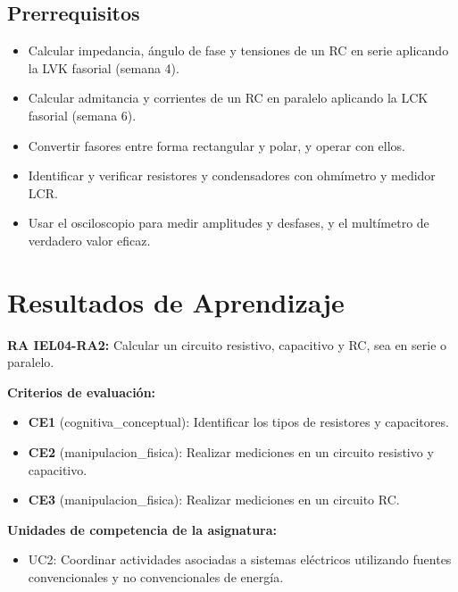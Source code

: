 \documentclass[11pt,letterpaper]{article}
\begin{document}
\subsection{Prerrequisitos}

\begin{itemize}
  \item Calcular impedancia, ángulo de fase y tensiones de un RC en serie aplicando la LVK fasorial (semana 4).
  \item Calcular admitancia y corrientes de un RC en paralelo aplicando la LCK fasorial (semana 6).
  \item Convertir fasores entre forma rectangular y polar, y operar con ellos.
  \item Identificar y verificar resistores y condensadores con ohmímetro y medidor LCR.
  \item Usar el osciloscopio para medir amplitudes y desfases, y el multímetro de verdadero valor eficaz.
\end{itemize}

\section{Resultados de Aprendizaje}

\begin{alineacion}
\textbf{RA IEL04-RA2:} Calcular un circuito resistivo, capacitivo y RC, sea en serie o paralelo.

\textbf{Criterios de evaluación:}

\begin{itemize}
  \item \textbf{CE1} (cognitiva\_conceptual): Identificar los tipos de resistores y capacitores.
  \item \textbf{CE2} (manipulacion\_fisica): Realizar mediciones en un circuito resistivo y capacitivo.
  \item \textbf{CE3} (manipulacion\_fisica): Realizar mediciones en un circuito RC.
\end{itemize}

\textbf{Unidades de competencia de la asignatura:}

\begin{itemize}
  \item UC2: Coordinar actividades asociadas a sistemas eléctricos utilizando fuentes convencionales y no convencionales de energía.
\end{itemize}
\end{alineacion}
\end{document}
